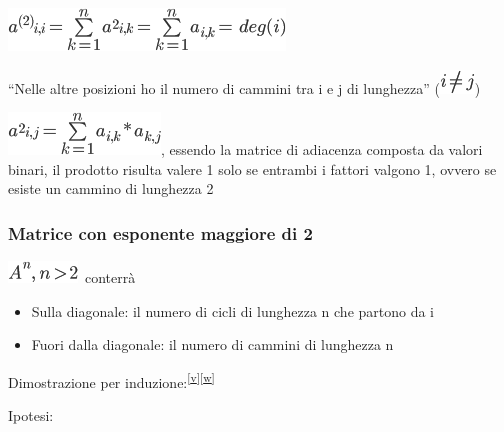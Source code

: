 \documentclass{article}
\providecommand{\tightlist}{%
  \setlength{\itemsep}{0pt}\setlength{\parskip}{0pt}}
\begin{document}
{{{\includegraphics{images/image414.png}

{}

{``Nelle altre posizioni ho il numero di cammini tra i e j di
lunghezza'' (}\includegraphics{images/image415.png}{)}

\includegraphics{images/image416.png}{, essendo la matrice di adiacenza
composta da valori binari, il prodotto risulta valere 1 solo se entrambi
i fattori valgono 1, ovvero se esiste un cammino di lunghezza 2}

{}

\hypertarget{h.yvqsj238z2mk}{\subsubsection{\texorpdfstring{{Matrice con
esponente maggiore di
2}}{Matrice con esponente maggiore di 2}}\label{h.yvqsj238z2mk}}

\includegraphics{images/image417.png}{~conterrà}

\begin{itemize}
\tightlist
\item
  {Sulla diagonale: il numero di cicli di lunghezza n che partono da i}
\item
  {Fuori dalla diagonale: il numero di cammini di lunghezza n}
\end{itemize}

{}

{Dimostrazione per
induzione:}\textsuperscript{\protect\hyperlink{cmnt22}{{[}v{]}}\protect\hyperlink{cmnt23}{{[}w{]}}}

{Ipotesi:}

}}}
\end{document}

